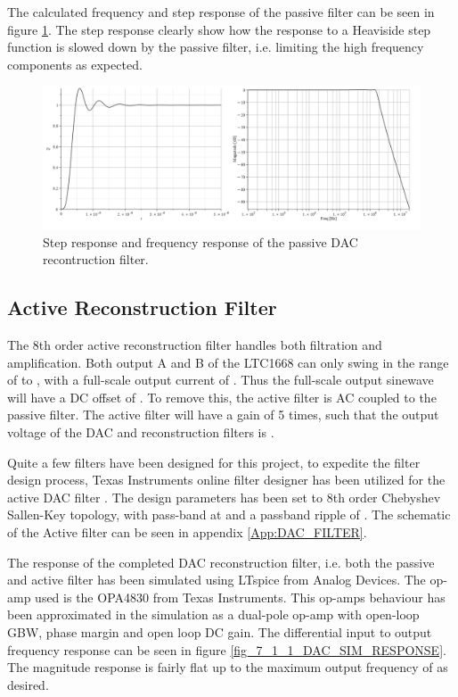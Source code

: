 The calculated frequency and step response of the passive filter can be seen in figure \ref{fig_7_1_1_DAC_PASSIVE_RESPONSE}. The step response clearly show how the response to a Heaviside step function is slowed down by the passive filter, i.e. limiting the high frequency components as expected.

\begin{figure}[H]
    \centering
    \includegraphics[clip, trim=0 0 0 0, width=1\textwidth]{Sections/7_SystemDesign/Figures/7_1_1_DAC_PASSIVE_RESPONSE.pdf}
    \caption{Step response and frequency response of the passive DAC recontruction filter.}
    \label{fig_7_1_1_DAC_PASSIVE_RESPONSE}
\end{figure}


\subsection*{Active Reconstruction Filter}
The 8th order active reconstruction filter handles both filtration and amplification. Both output A and B of the LTC1668 can only swing in the range of  to , with a full-scale output current of . Thus the full-scale output sinewave will have a DC offset of . To remove this, the active filter is AC coupled to the passive filter. The active filter will have a gain of 5 times, such that the output voltage of the DAC and reconstruction filters is .

Quite a few filters have been designed for this project, to expedite the filter design process, Texas Instruments online filter designer has been utilized for the active DAC filter \cite{TI_FILTER_TOOL}. The design parameters has been set to 8th order Chebyshev Sallen-Key topology, with pass-band at  and a passband ripple of . The schematic of the Active filter can be seen in appendix \ref{App:DAC_FILTER}.

The response of the completed DAC reconstruction filter, i.e. both the passive and active filter has been simulated using LTspice from Analog Devices. The op-amp used is the OPA4830 from Texas Instruments. This op-amps behaviour has been approximated in the simulation as a dual-pole op-amp with  open-loop GBW,  phase margin and  open loop DC gain. The differential input to output frequency response can be seen in figure \ref{fig_7_1_1_DAC_SIM_RESPONSE}. The magnitude response is fairly flat up to the maximum output frequency of  as desired.

